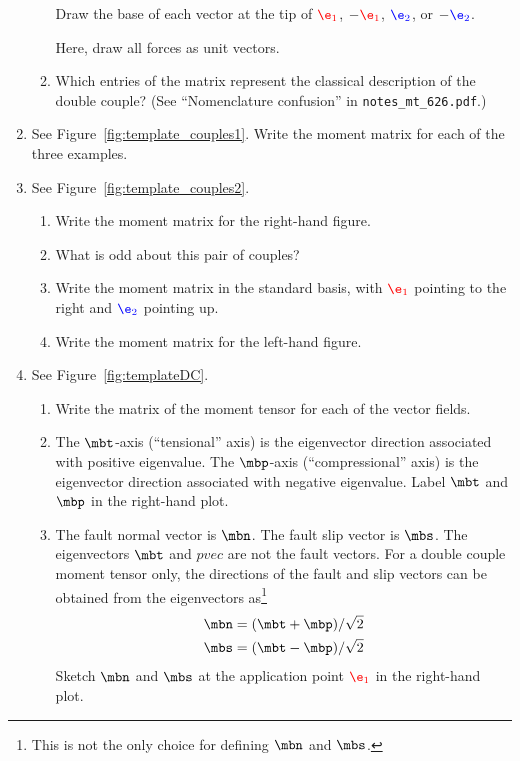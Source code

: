 \documentclass[11pt,titlepage,fleqn]{article}
\newcommand{\mtfile}{\texttt{notes\_mt\_626.pdf}}
\newcommand{\tvec}{\mbt}
\newcommand{\pvec}{\mbp}
\newcommand{\nvec}{\mbn}
\newcommand{\svec}{\mbs}
\newcommand{\eone}{\textcolor{red}{\e_1}}
\newcommand{\etwo}{\textcolor{blue}{\e_2}}
\begin{document}
\begin{enumerate}
\begin{enumerate}
Draw the base of each vector at the tip of $\eone$, $-\eone$, $\etwo$, or $-\etwo$.

Here, draw all forces as unit vectors. 

\item Which entries of the matrix represent the classical description of the double couple?
(See ``Nomenclature confusion'' in \mtfile.)
\end{enumerate}


\item 
\label{prob:couples1}
See Figure~\ref{fig:template_couples1}.
Write the moment matrix for each of the three examples.


\item
\label{prob:couples2}
See Figure~\ref{fig:template_couples2}.
%
\begin{enumerate}
\item Write the moment matrix for the right-hand figure.
\item What is odd about this pair of couples?
\item Write the moment matrix in the standard basis, with $\eone$ pointing to the right and $\etwo$ pointing up.
\item Write the moment matrix for the left-hand figure.
\end{enumerate}


\item 
\label{prob:DC}
See Figure~\ref{fig:templateDC}.
%
\begin{enumerate}
\item Write the matrix of the moment tensor for each of the vector fields.

\item The $\tvec$-axis (``tensional'' axis) is the eigenvector direction associated with positive eigenvalue. The $\pvec$-axis (``compressional'' axis) is the eigenvector direction associated with negative eigenvalue. Label $\tvec$ and $\pvec$ in the right-hand plot.

\item The fault normal vector is $\nvec$. The fault slip vector is $\svec$.
The eigenvectors $\tvec$ and $pvec$ are not the fault vectors. For a double couple moment tensor only, the directions of the fault and slip vectors can be obtained from the eigenvectors as\footnote{This is not the only choice for defining $\nvec$ and $\svec$.}
%
\begin{eqnarray*}
\nvec = (\tvec + \pvec)/\sqrt{2}
\\
\svec = (\tvec - \pvec)/\sqrt{2}
\end{eqnarray*}
%
Sketch $\nvec$ and $\svec$ at the application point $\eone$ in the right-hand plot.


\end{enumerate}
\end{enumerate}
\end{document}
